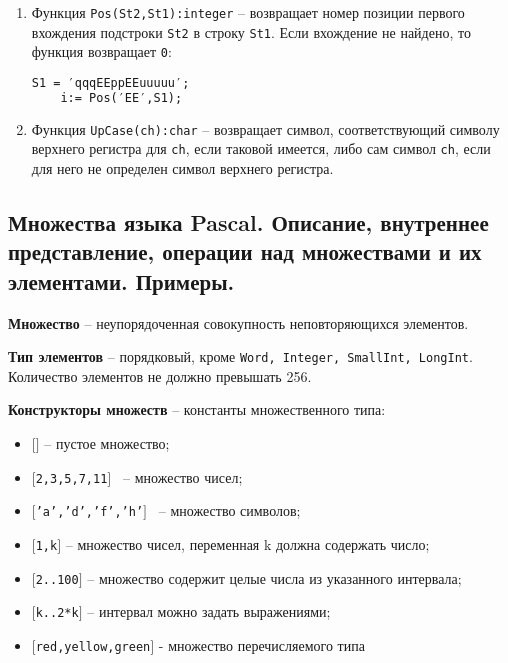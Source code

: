 \begin{enumerate}
\item Функция \texttt{Pos(St2,St1):integer} – возвращает номер позиции первого вхождения подстроки \texttt{St2} в строку \texttt{St1}. Если вхождение не найдено, то функция возвращает \texttt{0}:

\begin{lstlisting}[language=Pascal]
	S1 = ′qqqEEррEEuuuuu′;
 	i:= Pos(′EE′,S1);     
\end{lstlisting} 

\item Функция \texttt{UpCase(ch):char} – возвращает символ, соответствующий символу верхнего регистра для \texttt{ch}, если таковой имеется, либо сам символ \texttt{ch}, если для него не определен символ верхнего регистра.

\end{enumerate}





\newpage\subsection{Множества  языка  Pascal.  Описание,  внутреннее  представление,  операции  над  множествами и их элементами. Примеры. }

\begin{myquote}
            
\end{myquote}

\noindent
{\bf{Множество}} – неупорядоченная совокупность неповторяющихся элементов.

\noindent
{\bf{Тип элементов}} – порядковый, кроме \texttt{Word, Integer, SmallInt, LongInt}. Количество элементов не должно превышать 256.

\noindent
{\bf{Конструкторы множеств}} – константы множественного типа:
\begin{itemize}

\item \texttt{$[$$]$} – пустое множество;
\item \texttt{$[$2,3,5,7,11$]$ } – множество чисел;
\item \texttt{$[$’a’,’d’,’f’,’h’$]$ } – множество символов;
\item \texttt{$[$1,k$]$} – множество чисел, переменная k должна содержать число;
\item \texttt{$[$2..100$]$} – множество содержит целые числа из указанного интервала;
\item \texttt{$[$k..2*k$]$} – интервал можно задать выражениями;
\item \texttt{$[$red,yellow,green$]$} - множество перечисляемого типа

\end{itemize}

